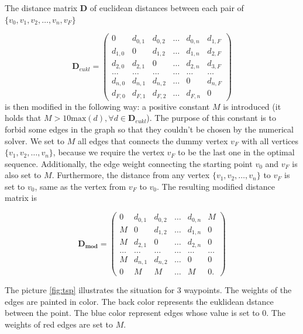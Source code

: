 The distance matrix $\mathbf{D}$ of euclidean distances between each pair of $\{v_{0}, v_{1}, v_{2}, \dots,v_{n},  v_{F}\}$ 

\begin{equation}
  \mathbf{D}_{eukl} = 
  \begin{pmatrix}
    0 & d_{0,1} & d_{0,2} & \dots & d_{0, n} & d_{1, F} \\
    d_{1,0} & 0 & d_{1,2} & \dots & d_{1, n} & d_{2, F} \\
    d_{2,0} & d_{2,1} & 0       & \dots & d_{2, n} & d_{3, F} \\
    \dots&\dots & \dots & \dots & \dots & \dots \\
    d_{n,0}& d_{n, 1} & d_{n, 2} & \dots & 0 & d_{n, F} \\
    d_{F, 0} & d_{F,1} & d_{F,2} & \dots & d_{F, n} & 0 
\end{pmatrix}
\end{equation}
is then modified in the following way:
a positive constant $M$ is introduced (it holds that $M>10\mathrm{max}(d),  \forall d \in \mathbf{D}_{eukl}$).
The purpose of this constant is to forbid some edges in the graph so that they couldn't be chosen by the numerical solver.
We set to $M$ all edges that connects the dummy vertex $v_{F}$ with all vertices $\{v_{1},v_{2}, \dots, v_{n}\}$, because we require the vertex $v_{F}$ to be the last one in the optimal sequence.
Additionally, the edge weight connecting the starting point $v_{0}$ and $v_{F}$ is also set to $M$.
Furthermore, the distance from any vertex $\{v_{1}, v_{2}, \dots, v_{n}\}$ to $v_{F}$ is set to $v_{0}$, same as the vertex from $v_{F}$ to $v_{0}$. 
The resulting modified distance matrix is

\begin{equation}
  \mathbf{D_{mod}} = 
  \begin{pmatrix}
    0 & d_{0,1} & d_{0,2} & \dots & d_{0, n} & M \\
    M & 0 & d_{1,2} & \dots & d_{1, n} & 0 \\
    M & d_{2,1} & 0       & \dots & d_{2, n} & 0 \\
    \dots&\dots & \dots & \dots & \dots & \dots \\
    M & d_{n, 1} & d_{n, 2} & \dots & 0 & 0 \\
    0 & M & M & \dots & M & 0 .  
\end{pmatrix}
\end{equation}

The picture \autoref{fig:tsp} illustrates the situation for 3 waypoints.
The weights of the edges are painted in color.
The back color represents the euklidean dstance between the point.
The blue color represent edges whose value is set to $0$.
The weights of red edges are set to $M$.


